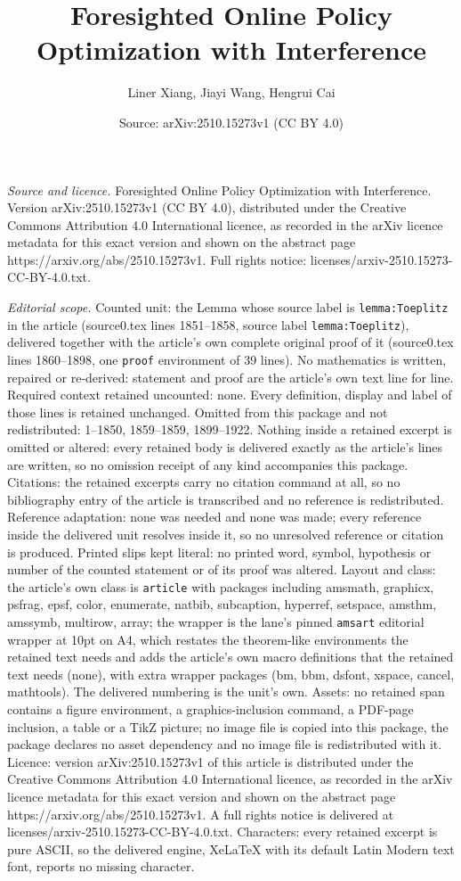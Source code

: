 \documentclass[10pt,a4paper]{amsart}
\title[Foresighted Online Policy Optimization with Interference]{Foresighted Online Policy Optimization with Interference}
\author{Liner Xiang, Jiayi Wang, Hengrui Cai}
\date{Source: arXiv:2510.15273v1 (CC BY 4.0)}
\begin{document}
\maketitle

\noindent\emph{Source and licence.} Foresighted Online Policy Optimization with Interference. Version arXiv:2510.15273v1 (CC BY 4.0), distributed under the Creative Commons Attribution 4.0 International licence, as recorded in the arXiv licence metadata for this exact version and shown on the abstract page https://arxiv.org/abs/2510.15273v1. Full rights notice: licenses/arxiv-2510.15273-CC-BY-4.0.txt.\par\smallskip

\noindent\textit{Editorial scope.} Counted unit: the Lemma whose source label is \texttt{lemma:Toeplitz} in the article (source0.tex lines 1851--1858, source label \texttt{lemma:Toeplitz}), delivered together with the article's own complete original proof of it (source0.tex lines 1860--1898, one \texttt{proof} environment of 39 lines). No mathematics is written, repaired or re-derived: statement and proof are the article's own text line for line. Required context retained uncounted: none. Every definition, display and label of those lines is retained unchanged. Omitted from this package and not redistributed: 1--1850, 1859--1859, 1899--1922. Nothing inside a retained excerpt is omitted or altered: every retained body is delivered exactly as the article's lines are written, so no omission receipt of any kind accompanies this package. Citations: the retained excerpts carry no citation command at all, so no bibliography entry of the article is transcribed and no reference is redistributed. Reference adaptation: none was needed and none was made; every reference inside the delivered unit resolves inside it, so no unresolved reference or citation is produced. Printed slips kept literal: no printed word, symbol, hypothesis or number of the counted statement or of its proof was altered. Layout and class: the article's own class is \texttt{article} with packages including amsmath, graphicx, psfrag, epsf, color, enumerate, natbib, subcaption, hyperref, setspace, amsthm, amssymb, multirow, array; the wrapper is the lane's pinned \texttt{amsart} editorial wrapper at 10pt on A4, which restates the theorem-like environments the retained text needs and adds the article's own macro definitions that the retained text needs (none), with extra wrapper packages (bm, bbm, dsfont, xspace, cancel, mathtools). The delivered numbering is the unit's own. Assets: no retained span contains a figure environment, a graphics-inclusion command, a PDF-page inclusion, a table or a TikZ picture; no image file is copied into this package, the package declares no asset dependency and no image file is redistributed with it. Licence: version arXiv:2510.15273v1 of this article is distributed under the Creative Commons Attribution 4.0 International licence, as recorded in the arXiv licence metadata for this exact version and shown on the abstract page https://arxiv.org/abs/2510.15273v1. A full rights notice is delivered at licenses/arxiv-2510.15273-CC-BY-4.0.txt. Characters: every retained excerpt is pure ASCII, so the delivered engine, XeLaTeX with its default Latin Modern text font, reports no missing character.
\end{document}
